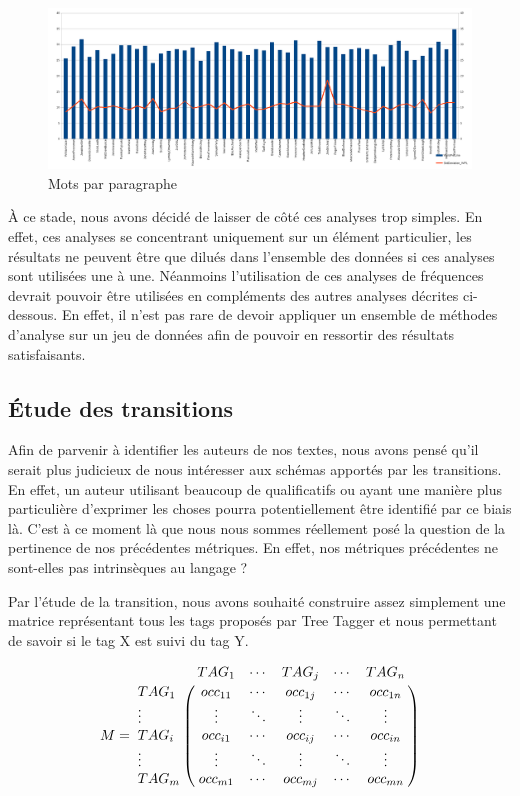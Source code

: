 \documentclass[a4paper,12pt]{report}
\begin{document}
\begin{figure}[hbtp]
\centering
\includegraphics[width=15cm]{fig/WPL.png}
\caption{Mots par paragraphe}
\label{WPL}
\end{figure}

À ce stade, nous avons décidé de laisser de côté ces analyses trop simples. En effet, ces analyses se concentrant uniquement sur un élément particulier, les résultats ne peuvent être que dilués dans l'ensemble des données si ces analyses sont utilisées une à une. Néanmoins l'utilisation de ces analyses de fréquences devrait pouvoir être utilisées en compléments des autres analyses décrites ci-dessous. En effet, il n'est pas rare de devoir appliquer un ensemble de méthodes d'analyse sur un jeu de données afin de pouvoir en ressortir des résultats satisfaisants.


\subsection{Étude des transitions}

Afin de parvenir à identifier les auteurs de nos textes, nous avons pensé qu'il serait plus judicieux de nous intéresser aux schémas apportés par les transitions. En effet, un auteur utilisant beaucoup de qualificatifs ou ayant une manière plus particulière d'exprimer les choses pourra potentiellement être identifié par ce biais là. C'est à ce moment là que nous nous sommes réellement posé la question de la pertinence de nos précédentes métriques. En effet, nos métriques précédentes ne sont-elles pas intrinsèques au langage ?

Par l'étude de la transition, nous avons souhaité construire assez simplement une matrice représentant tous les tags proposés par Tree Tagger et nous permettant de savoir si le tag X est suivi du tag Y.

\[M=\bordermatrix{
&TAG_{1}&\cdots&TAG_{j}&\cdots&TAG_{n}\cr
TAG_{1}& occ_{11} & \cdots & occ_{1j} & \cdots & occ_{1n} \cr
\vdots&\vdots&\ddots&\vdots&\ddots&\vdots\cr
TAG_{i}& occ_{i1} & \cdots & occ_{ij} & \cdots & occ_{in} \cr
\vdots&\vdots&\ddots&\vdots&\ddots&\vdots\cr
TAG_{m}& occ_{m1} & \cdots & occ_{mj} & \cdots & occ_{mn} \cr
}\]
\end{document}
